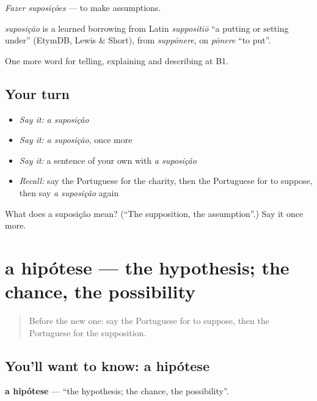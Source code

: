 \emph{Fazer suposições} — to make assumptions.

\begin{cousinweb}
\emph{suposição} is a learned borrowing from Latin \emph{suppositiō} \textquotedblleft{}a putting or setting under\textquotedblright{} (EtymDB, Lewis \& Short), from \emph{suppōnere}, on \emph{pōnere} \textquotedblleft{}to put\textquotedblright{}.
\end{cousinweb}

\begin{grammarlens}[title={What you've built}]
One more word for telling, explaining and describing at B1.
\end{grammarlens}

\subsection*{Your turn}
\begin{itemize}
\raggedright
  \item \emph{Say it:} \emph{a suposição}
  \item \emph{Say it:} \emph{a suposição}, once more
  \item \emph{Say it:} a sentence of your own with \emph{a suposição}
  \item \emph{Recall:} say the Portuguese for the charity, then the Portuguese for to suppose, then say \emph{a suposição} again
\end{itemize}

\begin{tcolorbox}[breakable,colback=teal!4,colframe=teal!35!black,title={Before you move on}]
What does a suposição mean? (\textquotedblleft{}The supposition, the assumption\textquotedblright{}.) Say it once more.
\end{tcolorbox}
\section[a hipótese]{a hipótese — the hypothesis; the chance, the possibility}

\label{lesson:PT-C368-hipotese}



\begin{quote}
Before the new one: say the Portuguese for to suppose, then the Portuguese for the supposition.
\end{quote}

\subsection*{You'll want to know: a hipótese}
\textbf{a hipótese} — \textquotedblleft{}the hypothesis; the chance, the possibility\textquotedblright{}.

